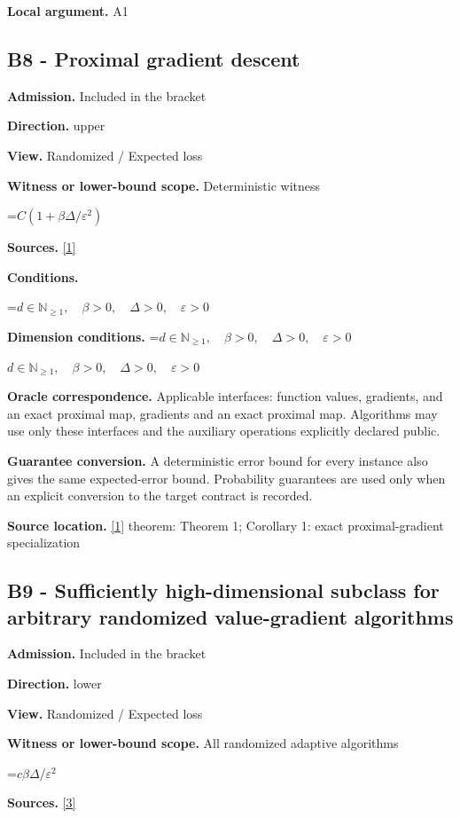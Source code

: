 \documentclass[10pt,a4paper]{article}
\newcommand{\AtlasMath}[1]{\par\begingroup\centering\setbox0=\hbox{$\displaystyle #1$}\ifdim\wd0>1.4\linewidth\typeout{ATLAS WIDE FORMULA: \the\wd0}\fi\ifdim\wd0>\linewidth\resizebox{\linewidth}{!}{\box0}\else\box0\fi\par\endgroup}
\newcommand{\AtlasInlineMath}[1]{\begingroup\setbox0=\hbox{$#1$}\ifdim\wd0>.4\linewidth\endgroup\AtlasMath{#1}\else\endgroup$#1$\fi}
\begin{document}
\textbf{Local argument.} A1

\subsection{B8 - Proximal gradient descent}
\textbf{Admission.} Included in the bracket

\textbf{Direction.} upper

\textbf{View.} Randomized / Expected loss

\textbf{Witness or lower-bound scope.} Deterministic witness

\AtlasMath{C(1+\beta\Delta/\varepsilon^2)}
\textbf{Sources.} \href{https://arxiv.org/pdf/1308.6594}{[1]}

\textbf{Conditions.} 
\AtlasMath{d\in\mathbb{N}_{\ge1},\quad \beta>0,\quad \Delta>0,\quad \varepsilon>0}


\textbf{Dimension conditions.} \AtlasInlineMath{d\in\mathbb{N}_{\ge1},\quad \beta>0,\quad \Delta>0,\quad \varepsilon>0}

\textbf{Oracle correspondence.} Applicable interfaces: function values, gradients, and an exact proximal map, gradients and an exact proximal map. Algorithms may use only these interfaces and the auxiliary operations explicitly declared public.

\textbf{Guarantee conversion.} A deterministic error bound for every instance also gives the same expected-error bound. Probability guarantees are used only when an explicit conversion to the target contract is recorded.

\textbf{Source location.} \href{https://arxiv.org/pdf/1308.6594}{[1]} theorem: Theorem 1; Corollary 1: exact proximal-gradient specialization

\subsection{B9 - Sufficiently high-dimensional subclass for arbitrary randomized value-gradient algorithms}
\textbf{Admission.} Included in the bracket

\textbf{Direction.} lower

\textbf{View.} Randomized / Expected loss

\textbf{Witness or lower-bound scope.} All randomized adaptive algorithms

\AtlasMath{c\beta\Delta/\varepsilon^2}
\textbf{Sources.} \href{https://arxiv.org/pdf/1710.11606}{[3]}
\end{document}
